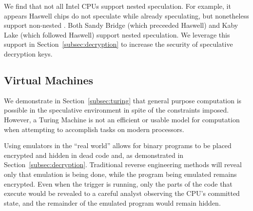 We find that not all Intel CPUs support nested speculation. For
example, it appears Haswell chips do not speculate while already speculating,
but nonetheless support non-nested \speculake. Both Sandy Bridge (which
preceeded Haswell) and Kaby Lake (which followed Haswell) support nested
speculation.
We leverage this support in Section~\ref{subsec:decryption} to
increase the security of speculative decryption keys.

%


% 
% 

\subsection{Virtual Machines}
We demonstrate in Section~\ref{subsec:turing} that general purpose computation 
is possible in the speculative environment in spite of the constraints 
imposed. However, a Turing Machine
is not an efficient or usable model for computation when
attempting to accomplish tasks on modern processors. 

Using emulators in the ``real world'' allows for binary programs to be
placed encrypted and hidden in dead code and, as demonstrated in
Section~\ref{subsec:decryption}.
Traditional reverse engineering methods will reveal only that
emulation is being done, while the program being emulated remains encrypted.
Even when the trigger is running, only the parts of the code that execute would
be revealed to a careful analyst observing the CPU's committed state, and the
remainder of the emulated program would remain hidden.

